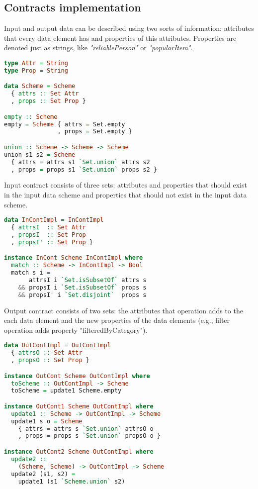 \subsection{Contracts implementation}

Input and output data can be described using two sorts of information: attributes that every data element has and properties of this attributes.
Properties are denoted just as strings, like {\em "reliablePerson"} or {\em "popularItem"}.

\begin{lstlisting}[language=Haskell]
type Attr = String
type Prop = String

data Scheme = Scheme
  { attrs :: Set Attr
  , props :: Set Prop }

empty :: Scheme
empty = Scheme { attrs = Set.empty
               , props = Set.empty }

union :: Scheme -> Scheme -> Scheme
union s1 s2 = Scheme
  { attrs = attrs s1 `Set.union` attrs s2
  , props = props s1 `Set.union` props s2 }
\end{lstlisting}

Input contract consists of three sets: 
attributes and properties that should exist in the input data scheme
and properties that should not exist in the input data scheme.

\begin{lstlisting}[language=Haskell]
data InContImpl = InContImpl
  { attrsI  :: Set Attr
  , propsI  :: Set Prop
  , propsI' :: Set Prop }

instance InCont Scheme InContImpl where
  match :: Scheme -> InContImpl -> Bool
  match s i =
       attrsI i `Set.isSubsetOf` attrs s
    && propsI i `Set.isSubsetOf` props s
    && propsI' i `Set.disjoint`  props s
\end{lstlisting}

Output contract consists of two sets: 
the attributes that operation adds to the each data element
and 
the new properties of the data elements (e.g., filter operation adds property "filteredByCategory").

\begin{lstlisting}[language=Haskell]
data OutContImpl = OutContImpl
  { attrsO :: Set Attr
  , propsO :: Set Prop }

instance OutCont Scheme OutContImpl where
  toScheme :: OutContImpl -> Scheme
  toScheme = update1 Scheme.empty

instance OutCont1 Scheme OutContImpl where
  update1 :: Scheme -> OutContImpl -> Scheme
  update1 s o = Scheme
    { attrs = attrs s `Set.union` attrsO o
    , props = props s `Set.union` propsO o }

instance OutCont2 Scheme OutContImpl where
  update2 :: 
    (Scheme, Scheme) -> OutContImpl -> Scheme
  update2 (s1, s2) = 
    update1 (s1 `Scheme.union` s2)
\end{lstlisting}

